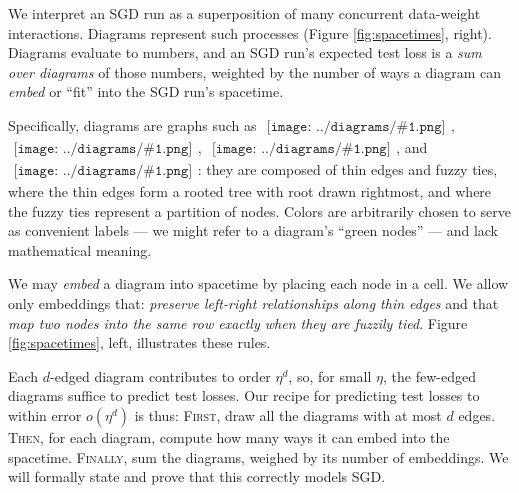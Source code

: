 \documentclass{article}
\theoremstyle{plain}
\theoremstyle{definition}
\newcommand{\sdia}[1]{\begin{gathered}\texttt{[image: ../diagrams/\#1.png]}\end{gathered}}
\begin{document}
            We interpret an SGD run as a superposition of many concurrent
            data-weight interactions.  Diagrams represent such
            processes (Figure \ref{fig:spacetimes}, right).  Diagrams evaluate
            to numbers, and an SGD run's expected test loss is a \emph{sum over
            diagrams} of those numbers, weighted by the number of ways a
            diagram can \emph{embed} or ``fit'' into the SGD run's spacetime.

            Specifically, diagrams are graphs such as $\sdia{(0-1)(01)}$, 
            $\sdia{(01-2)(02-12)}$, $\sdia{(01-2)(01-12)}$, and
            $\sdia{(0-123)(02-12-23)}$: they are
            composed of thin edges and fuzzy ties, where the thin edges form a
            rooted tree with root drawn rightmost, and where the fuzzy ties
            represent a partition of nodes.
            {\color{moor} Colors} are arbitrarily chosen to serve as convenient
            labels --- we might refer to a diagram's ``green nodes'' --- and
            lack mathematical meaning.

            We may \emph{embed} a diagram into spacetime by placing each node
            in a cell.  We allow only embeddings that: \emph{preserve
            left-right relationships along thin edges} and that \emph{map two
            nodes into the same row exactly when they are fuzzily tied}.
            Figure \ref{fig:spacetimes}, left, illustrates these rules.

            Each $d$-edged diagram contributes to order $\eta^d$, so, for small
            $\eta$, the few-edged diagrams suffice to predict test losses.  Our
            recipe for predicting test losses to within error $o(\eta^d)$ is
            thus: \textsc{First}, draw all the diagrams with at most $d$ edges.
            \textsc{Then}, for each diagram, compute how many ways it can
            embed into the spacetime.  \textsc{Finally}, sum the diagrams,
            weighed by its number of embeddings.  We will formally state and
            prove that this correctly models SGD. 

\end{document}

